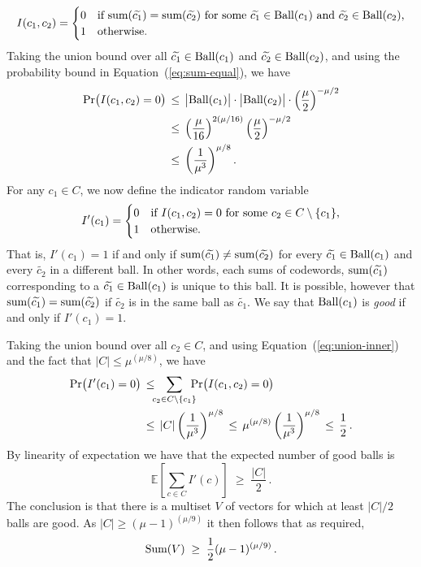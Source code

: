 \documentclass[11pt]{article}
\numberwithin{equation}{section}
\theoremstyle{definition}
\theoremstyle{plain}
\newcommand{\Prob}{\ensuremath{\textup{Pr}}}
\newcommand{\ball}[1]{\ensuremath{\textup{Ball}(#1)}}
\newcommand{\Vsum}{\ensuremath{\textup{Sum}}}
\newcommand{\vsum}{\ensuremath{\textup{sum}}}
\newcommand{\cbigI}{\ensuremath{\widetilde{c_1}}}
\newcommand{\cbigII}{\ensuremath{\widetilde{c_2}}}
\newcommand{\ELL}{\ensuremath{\mu}}
\newcommand{\expect}[1]{\mathbb{E}\left[{#1}\right]}
\begin{document}
%
\begin{equation*}
I(c_1,c_2) =
\begin{cases}
0 & \textup{if $\vsum(\cbigI)=\vsum(\cbigII)$ for some $\cbigI\in\ball{c_1}$ and  $\cbigII\in\ball{c_2}$,}\\
1 & \textup{otherwise.}
\end{cases}
\end{equation*}
%
Taking the union bound over all $\cbigI\in\ball{c_1}$ and
$\cbigII\in\ball{c_2}$, and using the probability bound in Equation~(\ref{eq:sum-equal}), we have
%
\begin{align}
\label{eq:union-inner}
\Prob \big( I(c_1, c_2) = 0 \big)
\, &\leq \, \big|\ball{c_1}\big|\cdot \big|\ball{c_2}\big| \cdot \left(\frac{\ELL}{2}\right)^{-\ELL/2}  \\
\, &\leq \, \left(\frac{\ELL}{16}\right)^{2(\ELL/16)} \left(\frac{\ELL}{2}\right)^{-\ELL/2} \notag \\
&\leq \, \left(\frac{1}{\ELL^3}\right)^{\ELL/8}. \notag
\end{align}
%
For any $c_1\in C$, we now define the indicator random variable
%
\begin{equation*}
I'(c_1) =
\begin{cases}
0 & \textup{if $I(c_1,c_2)=0$ for some $c_2\in C\setminus \{c_1\}$,}\\
1 & \textup{otherwise.}
\end{cases}
\end{equation*}
%
That is, $I'(c_1)=1$ if and only if
$\vsum(\cbigI)\neq\vsum(\cbigII)$
for every $\cbigI\in\ball{c_1}$ and every $\cbigII$ in a different ball. In other words, each sums of codewords, $\vsum(\cbigI)$ corresponding to a $\cbigI \in \ball{c_1}$ is unique to this ball. It is possible, however that $\vsum(\cbigI)=\vsum(\cbigII)$ if $\cbigII$ is in the same ball as $\cbigI$. We say that $\ball{c_1}$ is \emph{good} if and only if $I'(c_1)=1$.

Taking the union bound over all $c_2\in C$, and using Equation~(\ref{eq:union-inner}) and the fact that $|C|\leq \ELL^{(\ELL/8)}$, we have
%
\begin{align*}
%
\Prob \big( I'(c_1) = 0 \big) \, &\leq \!\!\! \sum_{c_2 \in C\setminus \{c_1\}} \!\!\!\! \Prob \big( I(c_1, c_2) = 0 \big)\\
\, &\leq \, |C| \left(\frac{1}{\ELL^3}\right)^{\ELL/8}
\, \leq \, \ELL^{(\ELL/8)} \left(\frac{1}{\ELL^3}\right)^{\ELL/8}
\, \leq \, \frac{1}{2} \,. \notag
\end{align*}
%
By linearity of expectation we have that the expected number of good balls is
\[
\expect{\sum_{c\in C}I'(c)} \;\geq\; \frac{|C|}2\,.
\]
The conclusion is that there is a multiset $V$ of vectors for
which at least $|C|/2$ balls are good. As  $|C|\geq (\ELL-1)^{(\ELL/9)}$ it then follows that as required,
\[
\Vsum(V) \;\geq\; \frac12 (\ELL-1)^{(\ELL/9)}\,.
\]
\end{document}
